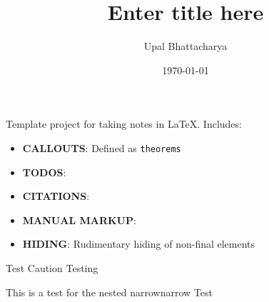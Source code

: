 \documentclass[a4paper,colorinlistoftodos]{article}
\author{Upal Bhattacharya}
\date{\today}
\title{Enter title here}
\begin{document}
\maketitle

\begingroup
    \hypersetup{linkcolor=black}
    \tableofcontents
    \listoftodos
    \pagebreak
\endgroup

\linenumbers

Template project for taking notes in \LaTeX.
Includes:
\begin{itemize}
\item \textbf{CALLOUTS}: Defined as \verb|theorems|
\item \textbf{TODOS}:
\item \textbf{CITATIONS}: \cite{openai2024HelloGpt4o}
\item \textbf{MANUAL MARKUP}: 
\item \textbf{HIDING}: Rudimentary hiding of non-final elements
\end{itemize}

\begin{caution}{Test Caution}{}
  Testing
  \begin{answer}{This is a test for the nested narrow}{narrow}
    Test
  \end{answer}

\end{caution}

\listofchanges




\end{document}
